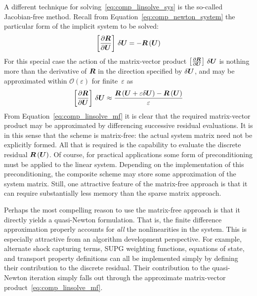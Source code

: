 A different technique for solving~\eqref{eq:comp_linsolve_sys} is the so-called Jacobian-free method.  Recall from Equation~\eqref{eq:comp_newton_system} the particular form of the implicit system to be solved:
\begin{equation*}
  \left[{\frac{\partial{{\boldsymbol{R}}}}{\partial{{\boldsymbol{U}}}}}\right]\,\delta{\boldsymbol{U}} = -{\boldsymbol{R}}\left({\boldsymbol{U}}\right)
\end{equation*}
For this special case the action of the matrix-vector product $\left[{\frac{\partial{{\boldsymbol{R}}}}{\partial{{\boldsymbol{U}}}}}\right]\,\delta{\boldsymbol{U}}$ is nothing more than the derivative of ${\boldsymbol{R}}$ in the direction specified by $\delta{\boldsymbol{U}}$, and may be approximated within $\mathcal{O}\left(\varepsilon\right)$ for finite~$\varepsilon$ as
\begin{equation}
  \left[{\frac{\partial{{\boldsymbol{R}}}}{\partial{{\boldsymbol{U}}}}}\right]\,\delta{\boldsymbol{U}} \approx \frac{{\boldsymbol{R}}\left({\boldsymbol{U}} + \varepsilon \delta {\boldsymbol{U}}\right) - {\boldsymbol{R}}\left({\boldsymbol{U}}\right)}{\varepsilon}
  \label{eq:comp_linsolve_mf}
\end{equation}
From Equation~\eqref{eq:comp_linsolve_mf} it is clear that the required matrix-vector product may be approximated by differencing successive residual evaluations.  It is in this sense that the scheme is matrix-free: the actual system matrix need not be explicitly formed.  All that is required is the capability to evaluate the discrete residual ${\boldsymbol{R}}\left({\boldsymbol{U}}\right)$.  Of course, for practical applications some form of preconditioning must be applied to the linear system. Depending on the implementation of this preconditioning, the composite scheme may store some approximation of the system matrix.  Still, one attractive feature of the matrix-free approach is that it can require substantially less memory than the sparse matrix approach.

Perhaps the most compelling reason to use the matrix-free approach is that it directly yields a quasi-Newton formulation.  That is, the finite difference approximation properly accounts for \emph{all} the nonlinearities in the system.  This is especially attractive from an algorithm development perspective.  For example, alternate shock capturing terms, SUPG weighting functions, equations of state, and transport property definitions can all be implemented simply by defining their contribution to the discrete residual. Their contribution to the quasi-Newton iteration simply falls out through the approximate matrix-vector product~\eqref{eq:comp_linsolve_mf}.






